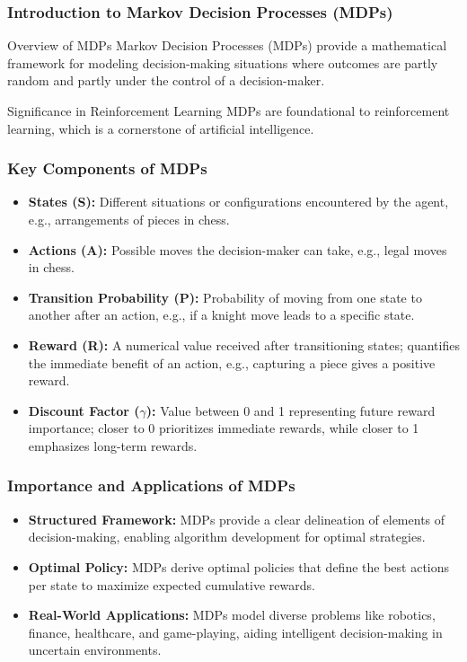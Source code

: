 \documentclass[aspectratio=169]{beamer}
\begin{document}
\frame{\titlepage}

\begin{frame}[fragile]
    \frametitle{Introduction to Markov Decision Processes (MDPs)}
    \begin{block}{Overview of MDPs}
        Markov Decision Processes (MDPs) provide a mathematical framework for modeling decision-making situations where outcomes are partly random and partly under the control of a decision-maker.
    \end{block}
    \begin{block}{Significance in Reinforcement Learning}
        MDPs are foundational to reinforcement learning, which is a cornerstone of artificial intelligence.
    \end{block}
\end{frame}

\begin{frame}[fragile]
    \frametitle{Key Components of MDPs}
    \begin{itemize}
        \item \textbf{States (S):} Different situations or configurations encountered by the agent, e.g., arrangements of pieces in chess.
        \item \textbf{Actions (A):} Possible moves the decision-maker can take, e.g., legal moves in chess.
        \item \textbf{Transition Probability (P):} Probability of moving from one state to another after an action, e.g., if a knight move leads to a specific state.
        \item \textbf{Reward (R):} A numerical value received after transitioning states; quantifies the immediate benefit of an action, e.g., capturing a piece gives a positive reward.
        \item \textbf{Discount Factor ($\gamma$):} Value between 0 and 1 representing future reward importance; closer to 0 prioritizes immediate rewards, while closer to 1 emphasizes long-term rewards.
    \end{itemize}
\end{frame}

\begin{frame}[fragile]
    \frametitle{Importance and Applications of MDPs}
    \begin{itemize}
        \item \textbf{Structured Framework:} MDPs provide a clear delineation of elements of decision-making, enabling algorithm development for optimal strategies.
        \item \textbf{Optimal Policy:} MDPs derive optimal policies that define the best actions per state to maximize expected cumulative rewards.
        \item \textbf{Real-World Applications:} MDPs model diverse problems like robotics, finance, healthcare, and game-playing, aiding intelligent decision-making in uncertain environments.
    \end{itemize}
\end{frame}
\end{document}
